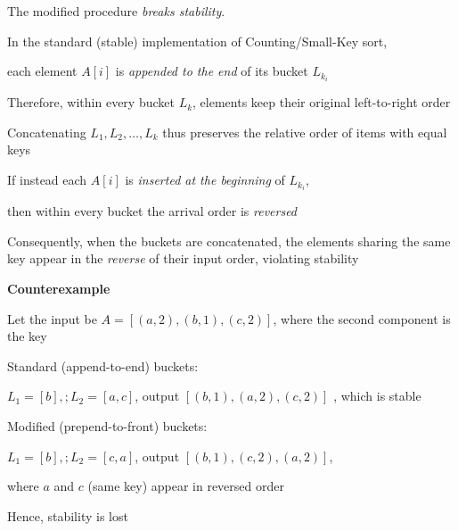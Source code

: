 \begin{solution}

\vspace{0.5cm}

The modified procedure \emph{breaks stability}.


In the standard (stable) implementation of Counting/Small-Key sort, 

each element $A[i]$ is \emph{appended to the end} of its bucket $L_{k_i}$

\vspace{0.2cm}


Therefore, within every bucket $L_{k}$, elements keep their original left-to-right order

Concatenating $L_1, L_2, \dots, L_k$ thus preserves the relative order of items with equal keys

\vspace{0.5cm}

If instead each $A[i]$ is \emph{inserted at the beginning} of $L_{k_i}$, 


\hspace{1cm}
then within every bucket the arrival order is \emph{reversed}

Consequently, when the buckets are concatenated, the elements sharing the same key appear in the \emph{reverse} of their input order, violating stability

\vspace{0.5cm}

\textbf{Counterexample}


\vspace{0.5cm}


Let the input be $A=[(a,2),(b,1),(c,2)]$, where the second component is the key


\quad Standard (append-to-end) buckets: 

\hspace{1.5cm}
$L_1=[b],; L_2=[a,c]$, output $[(b,1),(a,2),(c,2)]$ , which is stable


\quad Modified (prepend-to-front) buckets: 

\hspace{1.5cm}
$L_1=[b],; L_2=[c,a]$, output $[(b,1),(c,2),(a,2)]$, 

\hspace{1.5cm}
where $a$ and $c$ (same key) appear in reversed order

\vspace{0.5cm}

Hence, stability is lost

\end{solution}

